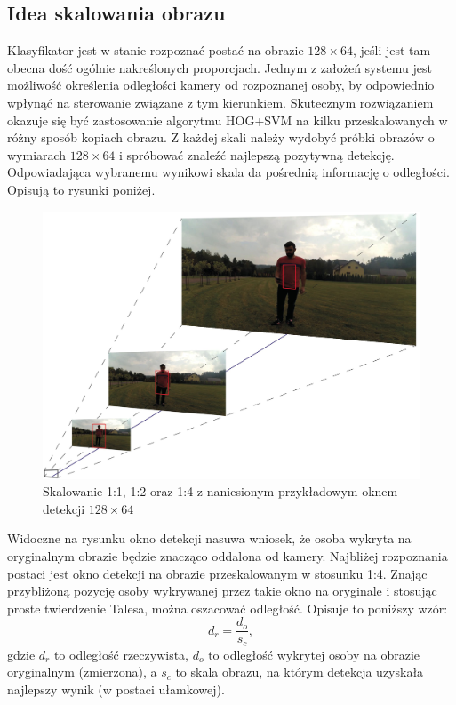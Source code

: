 \subsection{Idea skalowania obrazu}
Klasyfikator jest w stanie rozpoznać postać na obrazie $128\times 64$, jeśli jest tam obecna dość ogólnie nakreślonych proporcjach. Jednym z założeń systemu jest możliwość określenia odległości kamery od rozpoznanej osoby, by odpowiednio wpłynąć na sterowanie związane z tym kierunkiem. Skutecznym rozwiązaniem okazuje się być zastosowanie algorytmu HOG+SVM na kilku przeskalowanych w różny sposób kopiach obrazu. Z każdej skali należy wydobyć próbki obrazów o wymiarach $128\times 64$ i spróbować znaleźć najlepszą pozytywną detekcję. Odpowiadająca wybranemu wynikowi skala da pośrednią informację o odległości. Opisują to rysunki poniżej.
\begin{figure}[h]
	\centering
	\captionsetup{justification=centering,margin=1cm}
	\hspace*{0cm}
	\includegraphics[width=15.5cm]{2_scaling.jpg}
	\caption{Skalowanie 1:1, 1:2 oraz 1:4 z naniesionym przykładowym oknem detekcji $128 \times 64$}
	\label{fig:HOG_image_examples}
\end{figure}
\newline
Widoczne na rysunku okno detekcji nasuwa wniosek, że osoba wykryta na oryginalnym obrazie będzie znacząco oddalona od kamery. Najbliżej rozpoznania postaci jest okno detekcji na obrazie przeskalowanym w stosunku 1:4.
Znając przybliżoną pozycję osoby wykrywanej przez takie okno na oryginale i stosując proste twierdzenie Talesa, można oszacować odległość. Opisuje to poniższy wzór:
\begin{equation}
\label{eq:scaling}
d_r=\frac{d_o}{s_c},
\end{equation}
gdzie $d_r$ to odległość rzeczywista, $d_o$ to odległość wykrytej osoby na obrazie oryginalnym (zmierzona), a $s_c$ to skala obrazu, na którym detekcja uzyskała najlepszy wynik (w postaci ułamkowej).

